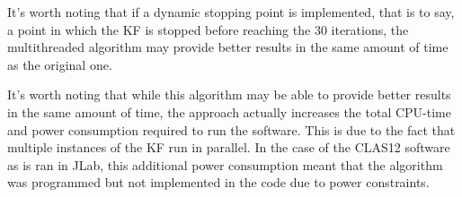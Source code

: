 It's worth noting that if a dynamic stopping point is implemented, that is to say, a point in which the KF is stopped before reaching the $30$ iterations, the multithreaded algorithm may provide better results in the same amount of time as the original one.

It's worth noting that while this algorithm may be able to provide better results in the same amount of time, the approach actually increases the total CPU-time and power consumption required to run the software.
This is due to the fact that multiple instances of the KF run in parallel.
In the case of the CLAS12 software as is ran in JLab, this additional power consumption meant that the algorithm was programmed but not implemented in the code due to power constraints.